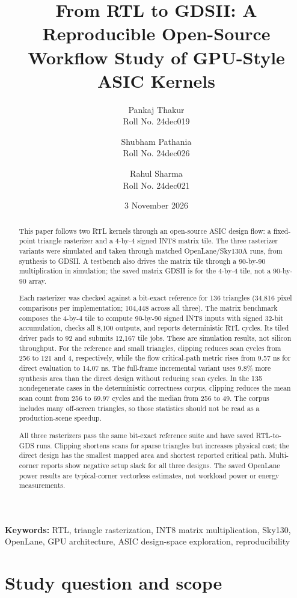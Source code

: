 \documentclass[10pt,a4paper]{article}
\title{\textbf{From RTL to GDSII: A Reproducible Open-Source\\
Workflow Study of GPU-Style ASIC Kernels}}
\author{Pankaj Thakur\\Roll No. 24dec019
  \and Shubham Pathania\\Roll No. 24dec026
  \and Rahul Sharma\\Roll No. 24dec021}
\date{3 November 2026}
\begin{document}
\maketitle

\begin{abstract}
This paper follows two RTL kernels through an open-source ASIC design flow:
a fixed-point triangle rasterizer and a 4-by-4 signed INT8 matrix tile. The
three rasterizer variants were simulated and taken through matched
OpenLane/Sky130A runs, from synthesis to GDSII. A testbench also drives the
matrix tile through a 90-by-90 multiplication in simulation; the saved
matrix GDSII is for the 4-by-4 tile, not a 90-by-90 array.

Each rasterizer was checked against a bit-exact reference for 136 triangles
(34,816 pixel comparisons per implementation; 104,448 across all three).
The matrix benchmark composes the 4-by-4 tile to compute 90-by-90 signed
INT8 inputs with signed 32-bit accumulation, checks all 8,100 outputs, and
reports deterministic RTL cycles. Its tiled driver pads to 92 and submits
12,167 tile jobs. These are simulation results, not silicon throughput. For
the reference and small triangles, clipping reduces scan cycles from 256 to
121 and 4, respectively, while the flow critical-path metric rises from
9.57 ns for direct evaluation to 14.07 ns. The full-frame incremental
variant uses 9.8\% more synthesis area than the direct design without
reducing scan cycles. In the 135 nondegenerate cases in the deterministic
correctness corpus, clipping reduces the mean scan count from 256 to
69.97 cycles and the median from 256 to 49. The corpus includes many
off-screen triangles, so those statistics should not be read as a
production-scene speedup.

All three rasterizers pass the same bit-exact reference suite and have saved
RTL-to-GDS runs. Clipping shortens scans for sparse triangles but increases
physical cost; the direct design has the smallest mapped area and shortest
reported critical path. Multi-corner reports show negative setup slack for
all three designs. The saved OpenLane power results are typical-corner
vectorless estimates, not workload power or energy measurements.
\end{abstract}

\textbf{Keywords:} RTL, triangle rasterization, INT8 matrix multiplication,
Sky130, OpenLane, GPU architecture, ASIC design-space exploration, reproducibility

\section{Study question and scope}
\end{document}
